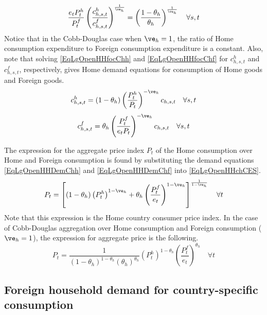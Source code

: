     \begin{equation}\label{EqLgOpenHHFracExpDomFor}
      \frac{e_t P^h_t}{P^f_t}\left(\frac{c^h_{h,s,t}}{c^f_{h,s,t}}\right)^{\frac{1}{\ve_h}} = \left(\frac{1-\theta_h}{\theta_h}\right)^{\frac{1}{\ve_h}} \quad\forall s,t
    \end{equation}
    Notice that in the Cobb-Douglas case when $\ve_h=1$, the ratio of Home consumption expenditure to Foreign consumption expenditure is a constant. Also, note that solving \eqref{EqLgOpenHHfocChh} and \eqref{EqLgOpenHHfocChf} for $c^h_{h,s,t}$ and $c^f_{h,s,t}$, respectively, gives Home demand equations for consumption of Home goods and Foreign goods.
    \begin{equation}\label{EqLgOpenHHDemChh}
          c^h_{h,s,t} = (1-\theta_h)\left(\frac{P^h_t}{P_t}\right)^{-\ve_h}c_{h,s,t} \quad\forall s,t
    \end{equation}
    \begin{equation}\label{EqLgOpenHHDemChf}
          c^f_{h,s,t} = \theta_h \left(\frac{P^f_t}{e_t P_t}\right)^{-\ve_h}c_{h,s,t} \quad\forall s,t
    \end{equation}

    The expression for the aggregate price index $P_t$ of the Home consumption over Home and Foreign consumption is found by substituting the demand equations \eqref{EqLgOpenHHDemChh} and \eqref{EqLgOpenHHDemChf} into \eqref{EqLgOpenHHchCES}.
    \begin{equation}\label{EqLgOpenHHaggPr}
      P_t = \left[(1-\theta_h)\left(P^h_t\right)^{1-\ve_h} + \theta_h\left(\frac{P^f_t}{e_t}\right)^{1-\ve_h}\right]^{\frac{1}{1-\ve_h}} \quad\forall t
    \end{equation}
    Note that this expression is the Home country consumer price index. In the case of Cobb-Douglas aggregation over Home consumption and Foreign consumption ($\ve_h=1$), the expression for aggregate price is the following.
    \begin{equation}\label{EqLgOpenHHaggPrCobb}
      P_t = \frac{1}{(1-\theta_h)^{1-\theta_h}(\theta_h)^{\theta_h}} \left(P^h_t\right)^{1-\theta_h}\left(\frac{P^f_t}{e_t}\right)^{\theta_h} \quad\forall t
    \end{equation}


  \subsection{Foreign household demand for country-specific consumption}\label{SecLgOpenHHforSpec}

